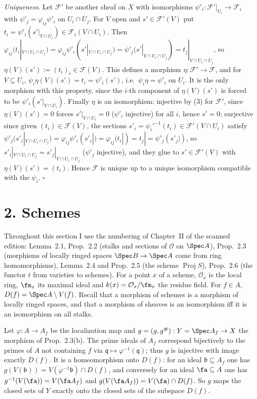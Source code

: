 \documentclass[11pt]{article}
\begin{document}
\emph{Uniqueness.} Let $\mathcal F'$ be another sheaf on $X$ with isomorphisms $\psi'_i\colon\mathcal F'|_{U_i}\to\mathcal F_i$ with $\psi'_j=\varphi_{ij}\psi'_i$ on $U_i\cap U_j$. For $V$ open and $s'\in\mathcal F'(V)$ put $t_i=\psi'_i(s'|_{V\cap U_i})\in\mathcal F_i(V\cap U_i)$. Then $\varphi_{ij}(t_i|_{V\cap U_i\cap U_j})=\varphi_{ij}\psi'_i(s'|_{V\cap U_i\cap U_j})=\psi'_j(s'|_{V\cap U_i\cap U_j})=t_j|_{V\cap U_i\cap U_j}$, so $\eta(V)(s'):=(t_i)_i\in\mathcal F(V)$. This defines a morphism $\eta\colon\mathcal F'\to\mathcal F$, and for $V\subseteq U_i$, $\psi_i\eta(V)(s')=t_i=\psi'_i(s')$, i.e.\ $\psi_i\eta=\psi'_i$ on $U_i$. It is the only morphism with this property, since the $i$-th component of $\eta(V)(s')$ is forced to be $\psi'_i(s'|_{V\cap U_i})$. Finally $\eta$ is an isomorphism: injective by (3) for $\mathcal F'$, since $\eta(V)(s')=0$ forces $s'|_{V\cap U_i}=0$ ($\psi'_i$ injective) for all $i$, hence $s'=0$; surjective since given $(t_i)\in\mathcal F(V)$, the sections $s'_i=\psi_i'^{-1}(t_i)\in\mathcal F'(V\cap U_i)$ satisfy $\psi'_j(s'_i|_{V\cap U_i\cap U_j})=\varphi_{ij}\psi'_i(s'_i|)=\varphi_{ij}(t_i|)=t_j|=\psi'_j(s'_j|)$, so $s'_i|_{V\cap U_i\cap U_j}=s'_j|_{V\cap U_i\cap U_j}$ ($\psi'_j$ injective), and they glue to $s'\in\mathcal F'(V)$ with $\eta(V)(s')=(t_i)$. Hence $\mathcal F$ is unique up to a unique isomorphism compatible with the $\psi_i$. \hfill$\square$

\section*{2. Schemes}

Throughout this section I use the numbering of Chapter~II of the scanned edition: Lemma~2.1, Prop.~2.2 (stalks and sections of $\mathcal O$ on $\Spec A$), Prop.~2.3 (morphisms of locally ringed spaces $\Spec B\to\Spec A$ come from ring homomorphisms), Lemma~2.4 and Prop.~2.5 (the scheme $\operatorname{Proj}S$), Prop.~2.6 (the functor $t$ from varieties to schemes). For a point $x$ of a scheme, $\mathcal O_x$ is the local ring, $\fm_x$ its maximal ideal and $k(x)=\mathcal O_x/\fm_x$ the residue field. For $f\in A$, $D(f)=\Spec A\setminus V(f)$. Recall that a morphism of schemes is a morphism of locally ringed spaces, and that a morphism of sheaves is an isomorphism iff it is an isomorphism on all stalks.

\pf
Let $\varphi:A\to A_f$ be the localization map and $g=(g,g^\#):Y=\Spec A_f\to X$ the morphism of Prop.~2.3(b). The prime ideals of $A_f$ correspond bijectively to the primes of $A$ not containing $f$ via $\mathfrak q\mapsto\varphi^{-1}(\mathfrak q)$; thus $g$ is injective with image exactly $D(f)$. It is a homeomorphism onto $D(f)$: for an ideal $\mathfrak b\subseteq A_f$ one has $g(V(\mathfrak b))=V(\varphi^{-1}\mathfrak b)\cap D(f)$, and conversely for an ideal $\fa\subseteq A$ one has $g^{-1}(V(\fa))=V(\fa A_f)$ and $g(V(\fa A_f))=V(\fa)\cap D(f)$. So $g$ maps the closed sets of $Y$ exactly onto the closed sets of the subspace $D(f)$.
\end{document}
